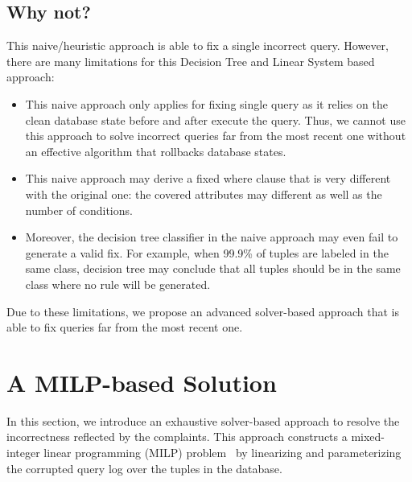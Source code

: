 \subsection{Why not?}
This naive/heuristic approach is able to fix a single incorrect query. However, 
there are many limitations for this Decision Tree and Linear System based approach:
\begin{itemize}
\item This naive approach only applies for fixing single query as it relies on the
clean database state before and after execute the query. Thus, we cannot use
this approach to solve incorrect queries far from the most recent one without 
an effective algorithm that rollbacks database states. 
\item This naive approach may derive a fixed where clause that is very different 
with the original one: the covered attributes may different as well as the number of 
conditions. 
\item Moreover, the decision tree classifier in the naive approach 
may even fail to generate a valid fix. For example, 
when 99.9\% of tuples are labeled
in the same class, decision tree may conclude that all tuples should be in the 
same class where no rule will be generated. 
\end{itemize}
Due to these limitations, we propose an advanced solver-based approach 
that is able to fix queries far from the most recent one. 







\section{A MILP-based Solution}
\label{sec:sol}
In this section, we introduce an exhaustive solver-based approach to 
resolve the incorrectness reflected by the complaints. 
This approach constructs a mixed-integer linear 
programming (MILP) problem~\cite{milp} by linearizing and parameterizing the 
corrupted query log over the tuples in the database. \\
{}


